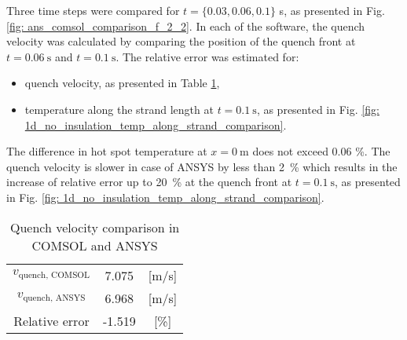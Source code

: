 Three time steps were compared for $t=\{0.03, 0.06, 0.1\}$ s, as presented in Fig. \ref{fig: ans_comsol_comparison_f_2_2}. In each of the software, the quench velocity was calculated by comparing the position of the quench front at $t=0.06~\text{s}$ and $t=0.1~\text{s}$. 
The relative error was estimated for: 
\begin{itemize}
    \item quench velocity, as presented in Table \ref{table: 1d_no_insulation_v_quench_comparison},
    \item temperature along the strand length at $t=0.1~\text{s}$, as presented in Fig. \ref{fig: 1d_no_insulation_temp_along_strand_comparison}.
\end{itemize}

The difference in hot spot temperature at $x=0~\text{m}$ does not exceed 0.06 \%. The quench velocity is slower in case of ANSYS by less than 2~\% which results in the increase of relative error up to 20~\% at the quench front at $t=0.1~\text{s}$, as presented in Fig. \ref{fig: 1d_no_insulation_temp_along_strand_comparison}.

\begin{table}[h!]
    \caption{Quench velocity comparison in COMSOL and ANSYS} 
    \vspace{-1.em} 
    \fontsize{10}{10}
    \selectfont 
    \renewcommand{\arraystretch}{1.5}
    \begin{center}
        \begin{tabular}{ ccc }  
        \hline
        $v_\text{quench, COMSOL}$ & 7.075 & [m/s] \\
        $v_\text{quench, ANSYS}$ & 6.968 & [m/s] \\
        Relative error & -1.519 & [\%] \\
        \hline 
        \end{tabular}
    \end{center}  
     \label{table: 1d_no_insulation_v_quench_comparison} 
 \end{table}

